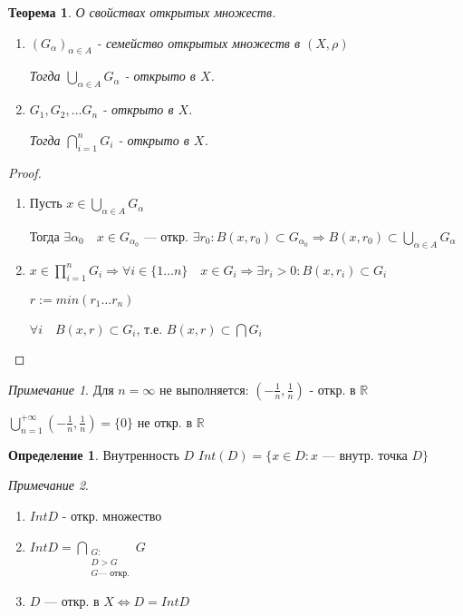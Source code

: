 \documentclass[12pt]{article}
\theoremstyle{plain}
\newtheorem{theorem}{Теорема}
\theoremstyle{remark}
\newtheorem*{remark}{Примечание}
\theoremstyle{definition}
\newtheorem*{definition}{Определение}
\begin{document}
\begin{theorem}
    О свойствах открытых множеств.

    \begin{enumerate}
        \item $(G_\alpha)_{\alpha\in A}$ - семейство открытых множеств в $(X,\rho)$
        
        Тогда $\bigcup_{\alpha\in A} G_\alpha$ - открыто в $X$.

        \item $G_1,G_2,\ldots G_n$ - открыто в $X$.
        
        Тогда $\bigcap_{i=1}^{n} G_i$ - открыто в $X$.
    \end{enumerate}

\end{theorem}

\begin{proof}
    \begin{enumerate}
        \item Пусть $x\in \bigcup_{\alpha\in A} G_\alpha$
        
        Тогда $\exists \alpha_0 \quad x\in G_{\alpha_0}$ --- откр. $\exists r_0 : B(x,r_0)\subset G_{\alpha_0} \Rightarrow B(x,r_0)\subset\bigcup_{\alpha\in A} G_\alpha$

        \item $x\in \prod_{i=1}^n G_i \Rightarrow \forall i\in\{1\ldots n\} \quad x\in G_i \Rightarrow \exists r_i>0 : B(x,r_i)\subset G_i$
        
        $r:=min(r_1\ldots r_n)$

        $\forall i \quad B(x,r)\subset G_i$, т.е. $B(x,r)\subset\bigcap G_i$
    \end{enumerate}
\end{proof}

\begin{remark}
    Для $n=\infty$ не выполняется: $(-\frac{1}{n},\frac{1}{n})$ - откр. в $\mathbb{R}$

    $\bigcup_{n=1}^{+\infty}(-\frac{1}{n},\frac{1}{n})=\{0\}$ не откр. в $\mathbb{R}$
\end{remark}

\begin{definition}
    Внутренность $D$ $Int(D)=\{x\in D : x \text{ --- внутр. точка }D\}$
\end{definition}

\begin{remark}
    \begin{enumerate}
        \item $Int D$ - откр. множество
        \item $Int D=\bigcap\limits_{\substack{G: \\ D>G \\ G \text{--- откр.}}} G$
        \item $D$ --- откр. в $X \Leftrightarrow D=Int D$
    \end{enumerate}
\end{remark}
\end{document}
